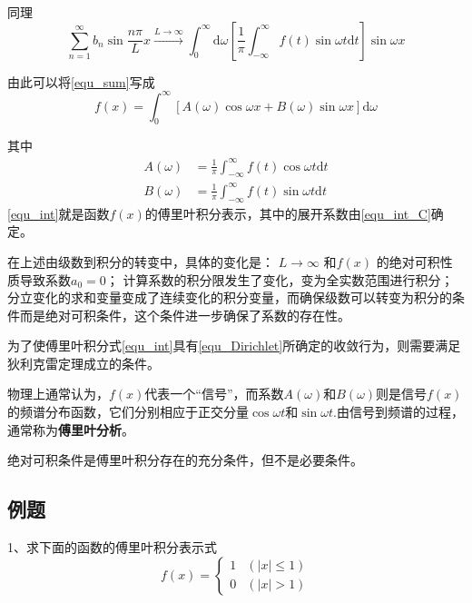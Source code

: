 \documentclass[UTF8,12pt]{ctexart}
\begin{document}
\noindent 同理
\begin{equation}
\sum_{n=1}^{\infty} b_{n} \sin \frac{n \pi}{L} x \stackrel{L \rightarrow \infty}{\longrightarrow} \int_{0}^{\infty} \mathrm{d} \omega\left[\frac{1}{\pi} \int_{-\infty}^{\infty} f(t) \sin \omega t \mathrm{d} t\right] \sin \omega x
\end{equation}

\noindent 由此可以将\autoref{equ_sum}写成
\begin{equation}
f(x)=\int_{0}^{\infty}[A(\omega) \cos \omega x+B(\omega) \sin \omega x] \mathrm{d} \omega\label{equ_int}
\end{equation}

\noindent 其中
\begin{equation}
\begin{aligned}
A(\omega)&=\frac{1}{\pi} \int_{-\infty}^{\infty} f(t) \cos \omega t \mathrm{d} t \\
 B(\omega)&=\frac{1}{\pi} \int_{-\infty}^{\infty} f(t) \sin \omega t \mathrm{d} t
 \end{aligned}\label{equ_int_C}
\end{equation}
\noindent \autoref{equ_int}就是函数$ f(x) $的傅里叶积分表示，其中的展开系数由\autoref{equ_int_C}确定。

	在上述由级数到积分的转变中，具体的变化是： $L \rightarrow \infty$ 和$ f(x) $ 的绝对可积性质导致系数$ a_{0} = 0 $； 计算系数的积分限发生了变化，变为全实数范围进行积分； 分立变化的求和变量变成了连续变化的积分变量，而确保级数可以转变为积分的条件而是绝对可积条件，这个条件进一步确保了系数的存在性。

	为了使傅里叶积分式\autoref{equ_int}具有\autoref{equ_Dirichlet}所确定的收敛行为，则需要满足狄利克雷定理成立的条件。

	物理上通常认为，$ f(x) $代表一个“信号”，而系数$ A (\omega) $和$ B(\omega) $则是信号$ f(x) $的频谱分布函数，它们分别相应于正交分量$ \cos \omega t $和$ \sin \omega t $.由信号到频谱的过程，通常称为\textbf{傅里叶分析}。

	绝对可积条件是傅里叶积分存在的充分条件，但不是必要条件。

	\subsection{例题}
	1、求下面的函数的傅里叶积分表示式
	\begin{equation}
	f(x)=\left\{\begin{array}{ll}{1} & {(|x| \leqslant 1)} \\ {0} & {(|x|>1)}\end{array}\right.\label{equ_example_3}
	\end{equation}
\end{document}
